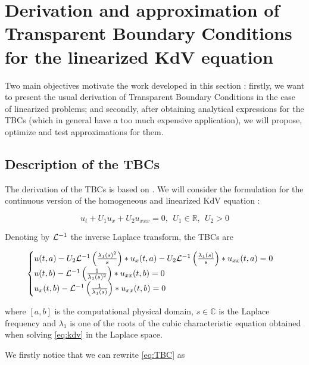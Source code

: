 \section{Derivation and approximation of Transparent Boundary Conditions for the linearized KdV equation}

\indent Two main objectives motivate the work developed in this section : firstly, we want to present the usual derivation of Transparent Boundary Conditions in the case of linearized problems; and secondly, after obtaining analytical expressions for the TBCs (which in general have a too much expensive application), we will propose, optimize and test approximations for them.

\subsection{Description of the TBCs}

\indent The derivation of the TBCs is based on \cite{besse2015} . We will consider the formulation for the continuous version of the homogeneous and linearized KdV equation :

\begin{equation}
\label{eq:kdv}
u_t + U_1u_x + U_2u_{xxx} = 0, \ \ U_1 \in \mathbb{R}, \ \ U_2 > 0
\end{equation}

\indent Denoting by $\mathcal{L}^{-1}$ the inverse Laplace transform, the TBCs are

\begin{equation}
\label{eq:TBC}
    \begin{cases}
        u(t,a) - U_2 \mathcal{L}^{-1} \left( \frac{\lambda_1(s)^2}{s} \right) * u_x(t,a) - U_2 \mathcal{L}^{-1} \left( \frac{\lambda_1(s)}{s} \right) * u_{xx}(t,a) = 0 \\
        u(t,b) - \mathcal{L}^{-1} \left( \frac{1}{\lambda_1(s)^2} \right) * u_{xx}(t,b) = 0 \\
        u_x(t,b) - \mathcal{L}^{-1} \left( \frac{1}{\lambda_1(s)} \right) * u_{xx}(t,b) = 0 
    \end{cases}
\end{equation}

\noindent where $[a,b]$ is the computational physical domain, $s \in \mathbb{C}$ is the Laplace frequency and $\lambda_1$ is one of the roots of the cubic characteristic equation obtained when solving \eqref{eq:kdv} in the Laplace space.

\indent We firstly notice that we can rewrite \eqref{eq:TBC} as

